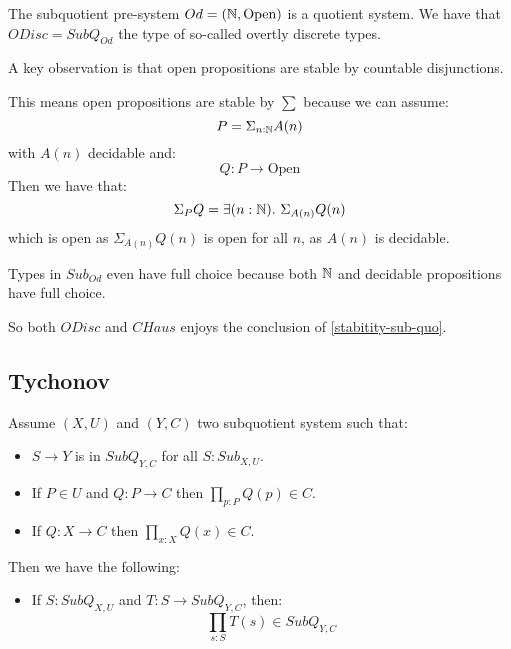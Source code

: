 \begin{example}
The subquotient pre-system $Od = (\mathbb{N},\mathrm{Open})$ is a quotient system. We have that $ODisc = SubQ_{Od}$ the type of so-called overtly discrete types.

A key observation is that open propositions are stable by countable disjunctions.

This means open propositions are stable by $\sum$ because we can assume:
\[P = \Sigma_{n:\mathbb{N}} A(n)\]
with $A(n)$ decidable and:
\[Q:P \to \mathrm{Open}\]
Then we have that:
\[\Sigma_PQ = \exists(n:\mathbb{N}).\ \Sigma_{A(n)} Q(n)\]
which is open as $\Sigma_{A(n)} Q(n)$ is open for all $n$, as $A(n)$ is decidable.

Types in $Sub_{Od}$ even have full choice because both $\mathbb{N}$ and decidable propositions have full choice.
\end{example}

So both $ODisc$ and $CHaus$ enjoys the conclusion of \cref{stabitity-sub-quo}.


\subsection{Tychonov}

\begin{proposition}\label{tychonov}
Assume $(X,U)$ and $(Y,C)$ two subquotient system such that:
\begin{itemize}
\item $S\to Y$ is in $SubQ_{Y,C}$ for all $S:Sub_{X,U}$.
\item If $P\in U$ and $Q:P\to C$ then $\prod_{p:P}Q(p) \in C$.
\item If $Q:X\to C$ then $\prod_{x:X}Q(x) \in C$.
\end{itemize}
Then we have the following:
\begin{itemize}
\item If $S:SubQ_{X,U}$ and $T:S\to SubQ_{Y,C}$, then:
\[\prod_{s:S}T(s) \in SubQ_{Y,C}\]
\end{itemize}
\end{proposition}

